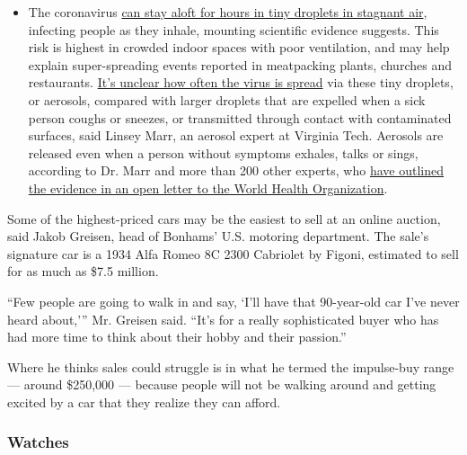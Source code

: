 \begin{itemize}
  \begin{itemize}
  \tightlist
  \item
    The coronavirus
    \href{https://www.nytimes3xbfgragh.onion/2020/07/04/health/239-experts-with-one-big-claim-the-coronavirus-is-airborne.html?action=click\&pgtype=Article\&state=default\&region=MAIN_CONTENT_3\&context=storylines_faq}{can
    stay aloft for hours in tiny droplets in stagnant air}, infecting
    people as they inhale, mounting scientific evidence suggests. This
    risk is highest in crowded indoor spaces with poor ventilation, and
    may help explain super-spreading events reported in meatpacking
    plants, churches and restaurants.
    \href{https://www.nytimes3xbfgragh.onion/2020/07/06/health/coronavirus-airborne-aerosols.html?action=click\&pgtype=Article\&state=default\&region=MAIN_CONTENT_3\&context=storylines_faq}{It's
    unclear how often the virus is spread} via these tiny droplets, or
    aerosols, compared with larger droplets that are expelled when a
    sick person coughs or sneezes, or transmitted through contact with
    contaminated surfaces, said Linsey Marr, an aerosol expert at
    Virginia Tech. Aerosols are released even when a person without
    symptoms exhales, talks or sings, according to Dr. Marr and more
    than 200 other experts, who
    \href{https://academic.oup.com/cid/article/doi/10.1093/cid/ciaa939/5867798}{have
    outlined the evidence in an open letter to the World Health
    Organization}.
  \end{itemize}
\end{itemize}

Some of the highest-priced cars may be the easiest to sell at an online
auction, said Jakob Greisen, head of Bonhams' U.S. motoring department.
The sale's signature car is a 1934 Alfa Romeo 8C 2300 Cabriolet by
Figoni, estimated to sell for as much as \$7.5 million.

``Few people are going to walk in and say, `I'll have that 90-year-old
car I've never heard about,''' Mr. Greisen said. ``It's for a really
sophisticated buyer who has had more time to think about their hobby and
their passion.''

Where he thinks sales could struggle is in what he termed the
impulse-buy range --- around \$250,000 --- because people will not be
walking around and getting excited by a car that they realize they can
afford.

\hypertarget{watches}{%
\subsubsection{\texorpdfstring{\textbf{Watches}}{Watches}}\label{watches}}

